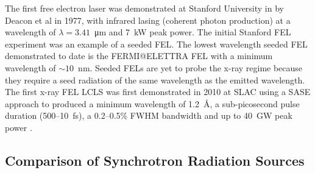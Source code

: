\documentclass[../main.tex]{subfiles}
\begin{document}
The first free electron laser was demonstrated at Stanford University in by Deacon et al \cite{deacon1977first} in 1977, with infrared lasing (coherent photon production) at a wavelength of $\lambda = 3.41$~\si{\micro\meter} and 7~\si{\kilo\watt} peak power. The initial Stanford FEL experiment was an example of a seeded FEL. The lowest wavelength seeded FEL demonstrated to date is the FERMI@ELETTRA FEL \cite{allaria2012highly} with a minimum wavelength of $\sim10$~\si{\nano\meter}. Seeded FELs are yet to probe the x-ray regime because they require a seed radiation of the same wavelength as the emitted wavelength. The first x-ray FEL LCLS was first demonstrated in 2010 at SLAC using a SASE approach to produced a minimum wavelength of 1.2~\si{\angstrom}, a sub-picosecond pulse duration (500--10~\si{\femto\second}), a 0.2--0.5\% FWHM bandwidth and up to 40~\si{\giga\watt} peak power \cite{emma2010first}.

\subsection{Comparison of Synchrotron Radiation Sources}
\end{document}
